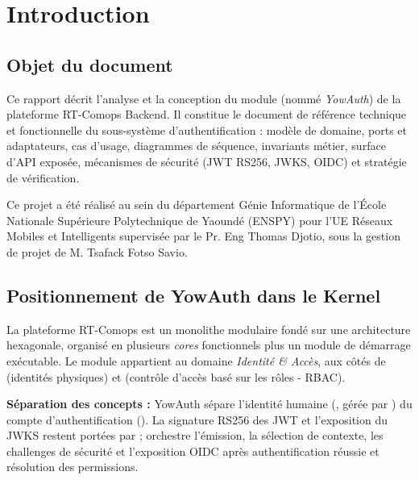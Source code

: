\chapter{Introduction}

\section{Objet du document}
Ce rapport décrit l'analyse et la conception du module \textbf{} (nommé \emph{YowAuth}) de la plateforme RT-Comops Backend. Il constitue le document de référence technique et fonctionnelle du sous-système d'authentification : modèle de domaine, ports et adaptateurs, cas d'usage, diagrammes de séquence, invariants métier, surface d'API exposée, mécanismes de sécurité (JWT RS256, JWKS, OIDC) et stratégie de vérification.

Ce projet a été réalisé au sein du département Génie Informatique de l'École Nationale Supérieure Polytechnique de Yaoundé (ENSPY) pour l'UE Réseaux Mobiles et Intelligents supervisée par le Pr. Eng Thomas Djotio, sous la gestion de projet de M. Tsafack Fotso Savio.

\section{Positionnement de YowAuth dans le Kernel}
La plateforme RT-Comops est un monolithe modulaire fondé sur une architecture hexagonale, organisé en plusieurs \emph{cores} fonctionnels plus un module de démarrage exécutable. Le module  appartient au domaine \emph{Identité \& Accès}, aux côtés de  (identités physiques) et  (contrôle d'accès basé sur les rôles - RBAC).

\begin{rolebox}
\textbf{Séparation des concepts :} YowAuth sépare l'identité humaine (, gérée par ) du compte d'authentification (). La signature RS256 des JWT et l'exposition du JWKS restent portées par  ;  orchestre l'émission, la sélection de contexte, les challenges de sécurité et l'exposition OIDC après authentification réussie et résolution des permissions.
\end{rolebox}

